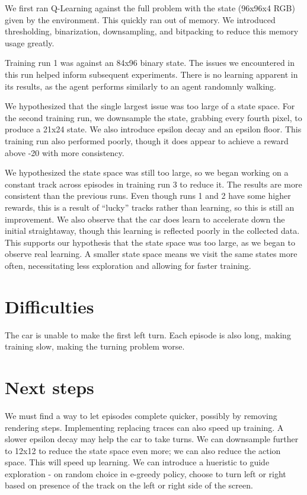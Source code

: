 \documentclass{article}
\begin{document}
We first ran Q-Learning against the full problem with the state (96x96x4
RGB) given by the environment. This quickly ran out of memory. We
introduced thresholding, binarization, downsampling, and bitpacking to
reduce this memory usage greatly.

Training run 1 was against an 84x96 binary state. The issues we
encountered in this run helped inform subsequent experiments. There is
no learning apparent in its results, as the agent performs similarly to
an agent randomnly walking.

We hypothesized that the single largest issue was too large of a state
space. For the second training run, we downsample the state, grabbing
every fourth pixel, to produce a 21x24 state. We also introduce epsilon
decay and an epsilon floor. This training run also performed poorly,
though it does appear to achieve a reward above -20 with more
consistency.

We hypothesized the state space was still too large, so we began working
on a constant track across episodes in training run 3 to reduce it. The
results are more consistent than the previous runs. Even though runs 1
and 2 have some higher rewards, this is a result of ``lucky'' tracks
rather than learning, so this is still an improvement. We also observe
that the car does learn to accelerate down the initial straightaway,
though this learning is reflected poorly in the collected data. This
supports our hypothesis that the state space was too large, as we began
to observe real learning.
A smaller state space means we visit the same states more often, necessitating less exploration and allowing for faster training.

\section{Difficulties}

The car is unable to make the first left turn. Each episode is also
long, making training slow, making the turning problem worse.

\section{Next steps}

We must find a way to let episodes complete quicker, possibly by removing rendering steps. 
Implementing replacing traces can also speed up training. 
A slower epsilon decay may help the car to take turns.
We can downsample further to 12x12 to reduce the state space even more; we can also reduce the action space.
This will speed up learning.
We can introduce a hueristic to guide exploration - on random choice in e-greedy policy, choose to turn left or right based on presence of the track on the left or right side of the screen.
\end{document}
